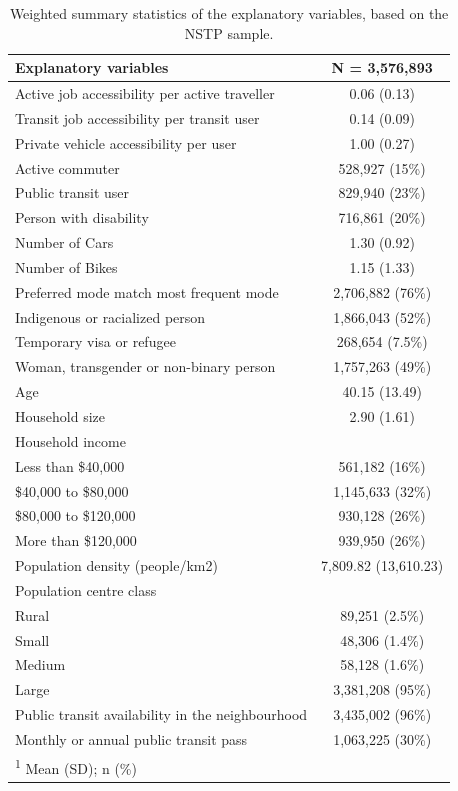\documentclass[preprint, 3p,
authoryear]{elsarticle} %
\begin{document}
\begin{table}

\caption{\label{tab:vardescriptions}\label{tab:var-description}Weighted summary statistics of the explanatory variables, based on the NSTP sample.}
\centering
\begin{tabular}[t]{lc}
\toprule
Explanatory variables & \textbf{N = 3,576,893}\\
\midrule
Active job accessibility per active traveller & 0.06 (0.13)\\
Transit job accessibility per transit user & 0.14 (0.09)\\
Private vehicle accessibility per user & 1.00 (0.27)\\
Active commuter & 528,927 (15\%)\\
Public transit user & 829,940 (23\%)\\
\addlinespace
Person with disability & 716,861 (20\%)\\
Number of Cars & 1.30 (0.92)\\
Number of Bikes & 1.15 (1.33)\\
Preferred mode match most frequent mode & 2,706,882 (76\%)\\
Indigenous or racialized person & 1,866,043 (52\%)\\
\addlinespace
Temporary visa or refugee & 268,654 (7.5\%)\\
Woman, transgender or non-binary person & 1,757,263 (49\%)\\
Age & 40.15 (13.49)\\
Household size & 2.90 (1.61)\\
Household income & \\
\addlinespace
\hspace{1em}Less than \$40,000 & 561,182 (16\%)\\
\hspace{1em}\$40,000 to \$80,000 & 1,145,633 (32\%)\\
\hspace{1em}\$80,000 to \$120,000 & 930,128 (26\%)\\
\hspace{1em}More than \$120,000 & 939,950 (26\%)\\
Population density (people/km2) & 7,809.82 (13,610.23)\\
\addlinespace
Population centre class & \\
\hspace{1em}Rural & 89,251 (2.5\%)\\
\hspace{1em}Small & 48,306 (1.4\%)\\
\hspace{1em}Medium & 58,128 (1.6\%)\\
\hspace{1em}Large & 3,381,208 (95\%)\\
\addlinespace
Public transit availability in the neighbourhood & 3,435,002 (96\%)\\
Monthly or annual public transit pass & 1,063,225 (30\%)\\
\bottomrule
\multicolumn{2}{l}{\rule{0pt}{1em}\textsuperscript{1} Mean (SD); n (\%)}\\
\end{tabular}
\end{table}
\end{document}
